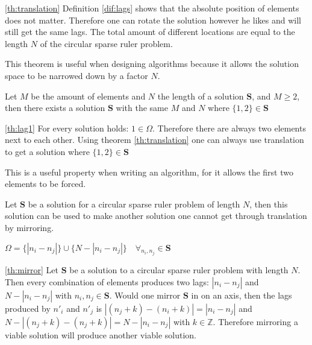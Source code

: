 \documentclass[a4paper, openany, oneside]{memoir}
\begin{document}
\begin{blockProofTheorem}{\ref{th:translation}}
    Definition \ref{dif:lags} shows that the absolute position of elements does not matter. Therefore one can rotate the solution however he likes and will still get the same lags. The total amount of different locations are equal to the length $N$ of the circular sparse ruler problem. 
\end{blockProofTheorem}

This theorem is useful when designing algorithms because it allows the solution space to be narrowed down by a factor $N$.

\begin{blockTheorem} \label{th:lag1}\nolinebreak
    Let $M$ be the amount of elements and $N$ the length of a solution $\mathbf{S}$, and $M\geq 2$, then there exists a solution $\mathbf{S}$ with the same $M$ and $N$ where $\{1,2\} \in \mathbf{S}$  \nolinebreak
\end{blockTheorem}

\begin{blockProofTheorem}{\ref{th:lag1}}
    For every solution holds: $1 \in \Omega$. Therefore there are always two elements next to each other. Using theorem \ref{th:translation} one can always use translation to get a solution where $\{1,2\} \in \mathbf{S}$
\end{blockProofTheorem}

This is a useful property when writing an algorithm, for it allows the first two elements to be forced.

\begin{blockTheorem} \label{th:mirror}\nolinebreak
    Let $\mathbf{S}$ be a solution for a circular sparse ruler problem of length $N$, then this solution can be used to make another solution one cannot get through translation by mirroring.
\end{blockTheorem}
$\Omega = \{|n_i-n_j|\} \cup \{N-|n_i-n_j|\} \quad \forall_{n_i,n_j}\in \mathbf{S}$

\begin{blockProofTheorem}{\ref{th:mirror}}
    Let $\mathbf{S}$ be a solution to a circular sparse ruler problem with length $N$. Then every combination of elements produces two lags: $|n_i-n_j|$ and $N-|n_i-n_j|$ with $n_i,n_j\in \mathbf{S}$. Would one mirror $\mathbf{S}$ in on an axis, then the lags produced by $n'_i$ and $n'_j$ is $|(n_j+k)-(n_i+k)| = |n_i-n_j|$ and $N-|(n_j+k)-(n_j+k)|=N-|n_i-n_j|$ with $k \in \mathbb{Z}$. Therefore mirroring a viable solution will produce another viable solution.
\end{blockProofTheorem}
\end{document}

